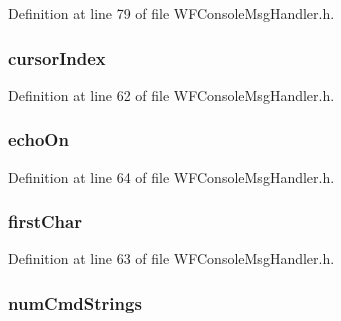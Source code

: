 Definition at line 79 of file W\+F\+Console\+Msg\+Handler.\+h.

\hypertarget{structt_console_context_ac9409ead0276c1cba1595911a6ee7e0d}{}
\subsubsection[{cursor\+Index}]{ cursor\+Index}\label{structt_console_context_ac9409ead0276c1cba1595911a6ee7e0d}


Definition at line 62 of file W\+F\+Console\+Msg\+Handler.\+h.

\hypertarget{structt_console_context_ae8e6ee696faa9b95d5cefbad3a2511d3}{}
\subsubsection[{echo\+On}]{ echo\+On}\label{structt_console_context_ae8e6ee696faa9b95d5cefbad3a2511d3}


Definition at line 64 of file W\+F\+Console\+Msg\+Handler.\+h.

\hypertarget{structt_console_context_aad87158f58fbda38fd65d0a7c9e2e06e}{}
\subsubsection[{first\+Char}]{ first\+Char}\label{structt_console_context_aad87158f58fbda38fd65d0a7c9e2e06e}


Definition at line 63 of file W\+F\+Console\+Msg\+Handler.\+h.

\hypertarget{structt_console_context_a89876e6f19e4204a6b2a2416d6b9bdcd}{}
\subsubsection[{num\+Cmd\+Strings}]{ num\+Cmd\+Strings}\label{structt_console_context_a89876e6f19e4204a6b2a2416d6b9bdcd}


